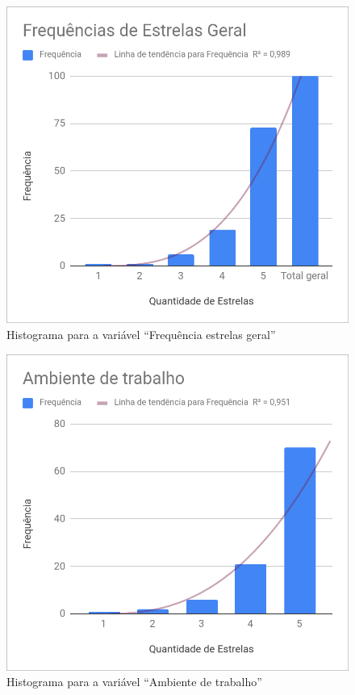 	\begin{figure}[H]
		\centering
		\caption{Histograma para a variável ``Frequência estrelas geral''}
		\label{fig:estrelas}
		\includegraphics[width=1\linewidth]{img/freq_estrelas_geral}
	\end{figure}

	\begin{figure}[H]
		\centering
		\caption{Histograma para a variável ``Ambiente de trabalho''}
		\label{fig:ambientetrabalho}
		\includegraphics[width=1\linewidth]{img/ambiente_trabalho}
	\end{figure}
	
